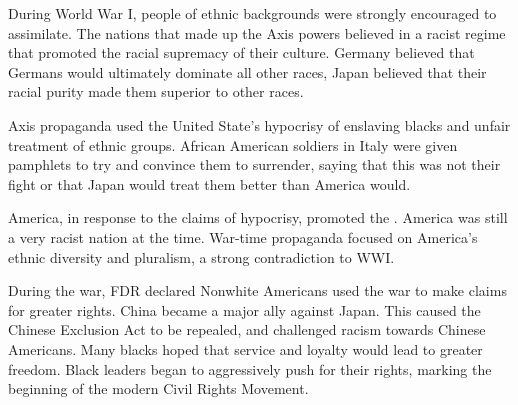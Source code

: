 During World War I, people of ethnic backgrounds were strongly encouraged to assimilate.
The nations that made up the Axis powers believed in a racist regime that promoted the racial supremacy of their culture.
Germany believed that Germans would ultimately dominate all other races, Japan believed that their racial purity made them superior to other races.

Axis propaganda used the United State's hypocrisy of enslaving blacks and unfair treatment of ethnic groups.
African American soldiers in Italy were given pamphlets to try and convince them to surrender, saying that this was not their fight or that Japan would treat them better than America would.

America, in response to the claims of hypocrisy, promoted the .
America was still a very racist nation at the time.
War-time propaganda focused on America's ethnic diversity and pluralism, a strong contradiction to WWI.

During the war, FDR declared 
Nonwhite Americans used the war to make claims for greater rights.
China became a major ally against Japan.
This caused the Chinese Exclusion Act to be repealed, and challenged racism towards Chinese Americans.
Many blacks hoped  that service and loyalty would lead to greater freedom.
Black leaders began to aggressively push for their rights, marking the beginning of the modern Civil Rights Movement.